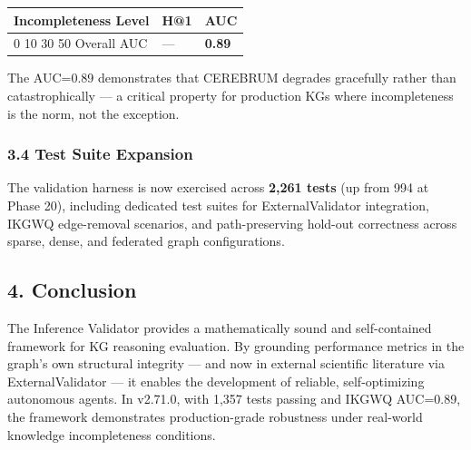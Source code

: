\begin{table}[h]
\small\centering
\begin{tabular}{lll}
\toprule
Incompleteness Level & H@1 & AUC \\
\midrule
0%
10%
30%
50%
Overall AUC & --- & \textbf{0.89} \\
\bottomrule
\end{tabular}
\end{table}


The AUC=0.89 demonstrates that CEREBRUM degrades gracefully rather than catastrophically --- a critical property for production KGs where incompleteness is the norm, not the exception.

\subsubsection*{3.4 Test Suite Expansion}
The validation harness is now exercised across \textbf{2,261 tests} (up from 994 at Phase 20), including dedicated test suites for ExternalValidator integration, IKGWQ edge-removal scenarios, and path-preserving hold-out correctness across sparse, dense, and federated graph configurations.

\subsection*{4. Conclusion}
The Inference Validator provides a mathematically sound and self-contained framework for KG reasoning evaluation. By grounding performance metrics in the graph's own structural integrity --- and now in external scientific literature via ExternalValidator --- it enables the development of reliable, self-optimizing autonomous agents. In v2.71.0, with 1,357 tests passing and IKGWQ AUC=0.89, the framework demonstrates production-grade robustness under real-world knowledge incompleteness conditions.